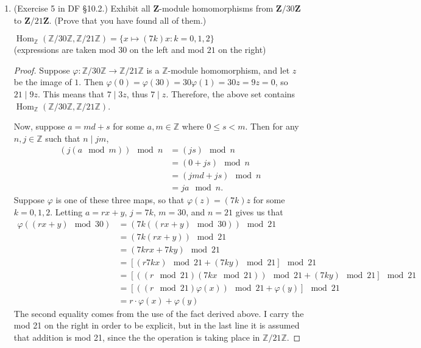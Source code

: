 \documentclass[10pt]{article}
\newcommand{\Z}{\mathbb{Z}}
\DeclareMathOperator*{\Hom}{Hom}
\begin{document}
%

\begin{enumerate}

\item (Exercise 5 in DF \S 10.2.) Exhibit all $\mathbf{Z}$-module homomorphisms from $\mathbf{Z}/30\mathbf{Z}$ to $\mathbf{Z}/21\mathbf{Z}$.  (Prove that you have found all of them.)

\begin{center}
\emph{$\Hom_{\Z}(\Z/30\Z , \Z / 21\Z) = \{x \mapsto (7k)x : k = 0, 1, 2 \}$}
\\
(expressions are taken mod $30$ on the left and mod $21$ on the right)
\end{center}

\begin{proof}
Suppose $\varphi : \Z/30\Z \rightarrow \Z / 21\Z$ is a $\Z$-module homomorphism, and let $z$ be the image of $1$.  Then $\varphi(0) = \varphi(30) = 30 \varphi(1) = 30z = 9z = 0$, so $21 \mid 9z$.  This means that $7 \mid 3z$, thus $7 \mid z$.  Therefore, the above set contains $\Hom_{\Z}(\Z/30\Z , \Z / 21\Z)$.

Now, suppose $a = md + s$ for some $a,m \in \Z$ where $0 \leq s < m$.  Then for any $n, j \in \Z$ such that $n \mid jm$,
\begin{align*}
(j(a \mod m)) \mod n &= (js) \mod n
\\
&= (0 + js) \mod n
\\
&= (jmd + js) \mod n
\\
&= ja \mod n.
\end{align*}
Suppose $\varphi$ is one of these three maps, so that $\varphi(z) = (7k)z$ for some $k = 0,1,2$.  Letting $a = rx+y$, $j = 7k$, $m = 30$, and $n = 21$ gives us that
\begin{align*}
\varphi ((rx + y) \mod 30) &= (7k((rx+y) \mod 30)) \mod 21 
\\
&= (7k(rx+y)) \mod 21
\\
&= (7krx + 7ky) \mod 21
\\
&= [(r 7kx) \mod 21 + (7ky) \mod 21] \mod 21
\\
&= [((r \mod 21) (7kx \mod 21)) \mod 21 + (7ky) \mod 21] \mod 21
\\
&= [((r \mod 21)\varphi(x)) \mod 21 + \varphi(y)] \mod 21
\\
&= r \cdot \varphi(x) + \varphi(y)
\end{align*}
The second equality comes from the use of the fact derived above.  I carry the mod 21 on the right in order to be explicit, but in the last line it is assumed that addition is mod 21, since the the operation is taking place in $\Z / 21\Z$.
\end{proof}


\end{enumerate}
\end{document}
